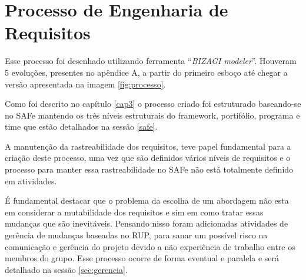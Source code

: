 \graphicspath{ {figuras/} }
\chapter[Processo de Engenharia de Requisitos]{Processo de Engenharia de Requisitos}\label{cap4}

Esse processo foi desenhado utilizando ferramenta ``\textit{BIZAGI modeler}''. Houveram 5 evoluções,
presentes no apêndice A, a partir do primeiro esboço até chegar a versão apresentada na imagem \ref{fig:processo}.

Como foi descrito no capítulo \ref{cap3} o processo criado foi estruturado baseando-se no
SAFe mantendo os três níveis estruturais do framework, portifólio, programa e time
que estão detalhados na sessão \ref{safe}.

A manutenção da rastreabilidade dos requisitos, teve papel fundamental para a criação deste processo,
uma vez que são definidos vários níveis de requisitos e o processo para manter essa
rastreabilidade no SAFe não está totalmente definido em atividades.

É fundamental destacar que o problema da escolha de um abordagem não esta em considerar
a mutabilidade dos requisitos e sim em como tratar essas mudanças que são inevitáveis.
Pensando nisso foram adicionadas atividades de gerência de mudanças baseadas no RUP,
para sanar um possível risco na comunicação e gerência do projeto devido a não experiência
de trabalho entre os membros do grupo. Esse processo ocorre de forma eventual e paralela
e será detalhado na sessão \ref{sec:gerencia}.


